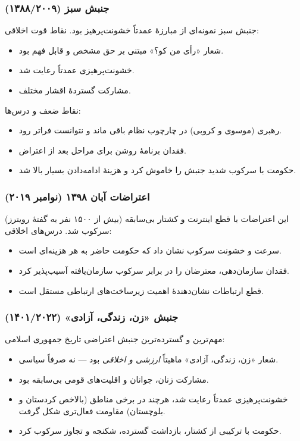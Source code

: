 \subsubsection{جنبش سبز (۱۳۸۸/۲۰۰۹)}
جنبش سبز نمونه‌ای از مبارزهٔ عمدتاً خشونت‌پرهیز بود. نقاط قوت اخلاقی:
\begin{itemize}
\item شعار «رأی من کو؟» مبتنی بر حق مشخص و قابل فهم بود.
\item خشونت‌پرهیزی عمدتاً رعایت شد.
\item مشارکت گستردهٔ اقشار مختلف.
\end{itemize}
نقاط ضعف و درس‌ها:
\begin{itemize}
\item رهبری (موسوی و کروبی) در چارچوب نظام باقی ماند و نتوانست فراتر رود.
\item فقدان برنامهٔ روشن برای مراحل بعد از اعتراض.
\item حکومت با سرکوب شدید جنبش را خاموش کرد و هزینهٔ ادامه‌دادن بسیار بالا 
شد.
\end{itemize}

\subsubsection{اعتراضات آبان ۱۳۹۸ (نوامبر ۲۰۱۹)}
این اعتراضات با قطع اینترنت و کشتار بی‌سابقه (بیش از ۱۵۰۰ نفر به گفتهٔ 
رویترز) سرکوب شد. درس‌های اخلاقی:
\begin{itemize}
\item سرعت و خشونت سرکوب نشان داد که حکومت حاضر به هر هزینه‌ای است.
\item فقدان سازمان‌دهی، معترضان را در برابر سرکوب سازمان‌یافته آسیب‌پذیر کرد.
\item قطع ارتباطات نشان‌دهندهٔ اهمیت زیرساخت‌های ارتباطی مستقل است.
\end{itemize}

\subsubsection{جنبش «زن، زندگی، آزادی» (۱۴۰۱/۲۰۲۲)}
مهم‌ترین و گسترده‌ترین جنبش اعتراضی تاریخ جمهوری اسلامی:
\begin{itemize}
\item شعار «زن، زندگی، آزادی» ماهیتاً \textit{ارزشی و اخلاقی} بود — نه 
صرفاً سیاسی.
\item مشارکت زنان، جوانان و اقلیت‌های قومی بی‌سابقه بود.
\item خشونت‌پرهیزی عمدتاً رعایت شد، هرچند در برخی مناطق (بالاخص 
کردستان و بلوچستان) مقاومت فعال‌تری شکل گرفت.
\item حکومت با ترکیبی از کشتار، بازداشت گسترده، شکنجه و تجاوز سرکوب کرد.
\end{itemize}

